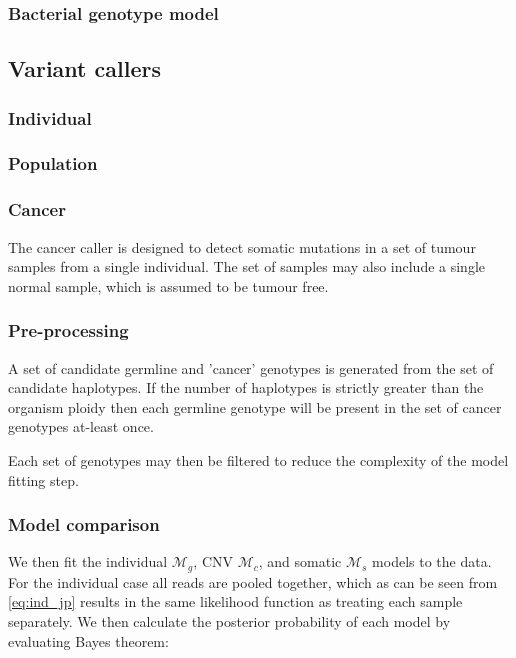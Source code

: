 \documentclass{article}
\begin{document}
\subsubsection{Bacterial genotype model}

\subsection{Variant callers}

\subsubsection{Individual}

\subsubsection{Population}

\subsubsection{Cancer}

The cancer caller is designed to detect somatic mutations in a set of tumour samples from a single individual. The set of samples may also include a single normal sample, which is assumed to be tumour free.

\subsubsection{Pre-processing}

A set of candidate germline and 'cancer' genotypes is generated from the set of candidate haplotypes. If the number of haplotypes is strictly greater than the organism ploidy then each germline genotype will be present in the set of cancer genotypes at-least once. 

Each set of genotypes may then be filtered to reduce the complexity of the model fitting step.

\subsubsection{Model comparison}

We then fit the individual $\mathcal{M}_g$, CNV $\mathcal{M}_c$, and somatic $\mathcal{M}_s$ models to the data. For the individual case all reads are pooled together, which as can be seen from \ref{eq:ind_jp} results in the same likelihood function as treating each sample separately. We then calculate the posterior probability of each model by evaluating Bayes theorem:
\end{document}
